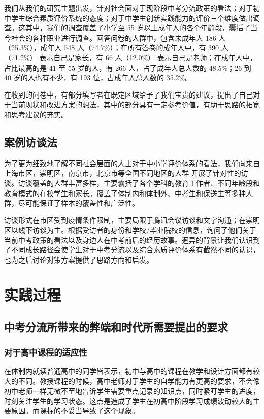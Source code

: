 \documentclass[12pt,UTF8]{ctexart}
\begin{document}
\par{我们从我们的研究主题出发，针对社会面对于现阶段中考分流政策的看法；对于初中学生综合素质评价系统的态度；对于中学生创新实践能力的评价三个维度做出调查。这其中，我们的调查覆盖了小学至
	55 岁以上成年人的各个年龄段，囊括了当今社会的各种职业进行调查。回答问卷的人群中，包含未成年人 186 人（25.3\%），成年人 548
	人（74.7\%）；在所有答卷的成年人中，有 390 人（71.2\%） 表示自己是家长，有 66 人（12.0\%） 表示自己是老师；在成年人中，占比最高的是
	41 至 55 岁的人，有 266 人，占了成年人总人数的 48.5\%；26 到 40 岁的人也有不少，有 193 位，占成年人总人数的 35.2\%。}

\par{
	在收到的问卷中，有部分填写者在既定区域给予了我们宝贵的建议，提出了自己对于当前现状和改进方案的想法，其中的部分具有一定参考价值，有助于思路的拓宽和思考建议的充实。}

\subsection{案例访谈法}
\par{为了更为细致地了解不同社会层面的人士对于中小学评价体系的看法，我们向来自上海市区，崇明区，南京市，北京市等全国不同地区的人群
	开展了针对性的访谈。访谈覆盖的人群丰富多样，主要囊括了各个学科的教育工作者、不同年龄段和教育模式的在校学生和家长。覆盖了体制内和体制外、中考生和保送生等多种人群，尽可能保证了样本的覆盖性和广泛性。}

\par{访谈形式在市区受到疫情条件限制，主要局限于腾讯会议访谈和文字沟通；在崇明区以线下访谈为主。根据受访者的身份和学校/毕业院校的信息，询问了他们关于当前中考政策的看法以及身边人在中考前后的经历故事。迥异的背景让我们认识到了不同成长路径会使学生对于中考分流以及综合素质评价体系有截然不同的认识，也为之后讨论对策方案提供了思路方向和启发。}

\newpage

\section {实践过程}
\subsection {中考分流所带来的弊端和时代所需要提出的要求}
\subsubsection {对于高中课程的适应性}
\par{在体制内就读普通高中的同学皆表示，初中与高中的课程在教学和设计方面都有较大的不同。教授课程的时候，高中老师对于学生的自学能力有更高的要求，不会像初中老师一样无微不至地告诉学生需要重点记录的知识点，同时紧盯学生的进度，时刻关注学生的学习状态。这点是造成了学生在初高中阶段学习成绩波动较大的主要原因。而课标的不妥当导致了这个现象。}
\end{document}
